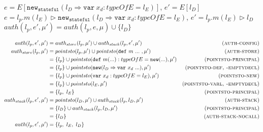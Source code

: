 \documentclass{llncs}
\newcommand{\keywadj}[1]{\mathtt{#1}}
\newcommand{\keyw}[1]{\keywadj{#1}~}
\begin{document}
\noindent$e = E[\keywadj{new}_{\keywadj{stateful}}(l_D \Rightarrow \keyw{var} x_d : typeOfE = l_E)]$, $e' = E[l_D]$\\

\noindent$e = l_p.m(l_E) \rhd \keywadj{new}_{\keywadj{stateful}}(l_D \Rightarrow \keyw{var} x_d : typeOfE = l_E)$, $e' = l_p.m(l_E) \rhd l_D$\\

\noindent$auth(l_p, e', \mu') = auth(l_p, e, \mu) \cup \{ l_D \}$

\begin{align*}
auth(l_p, e', \mu') &= auth_{store}(l_p, \mu') \cup auth_{stack}(l_p, e', \mu') & (\textsc{auth-config})\\
auth_{store}(l_p, \mu') &= pointsto(l_p, \mu') \cup pointsto(\keyw{def} m~...~, \mu') & (\textsc{auth-store})\\
 &= \{ l_p \} \cup pointsto(\keyw{def} m(...) : typeOfE = \keywadj{new}(...), \mu') & (\textsc{pointsto-principal})\\
 &= \{ l_p \} \cup pointsto(\keywadj{new}(l_D \Rightarrow \keyw{var} x_d~...), \mu') & (\textsc{pointsto-def, -emptydecl})\\
 &= \{ l_p \} \cup pointsto(\keyw{var} x_d : typeOfE = l_E), \mu') & (\textsc{pointsto-new})\\
 &= \{ l_p \} \cup pointsto(l_E, \mu') & (\textsc{pointsto-varl, -emptydecl})\\ 
 &= \{ l_p,~l_E \} & (\textsc{pointsto-principal})\\
auth_{stack}(l_p, e', \mu') &= pointsto(l_D, \mu') \cup auth_{stack}(l_p, l_D, \mu') & (\textsc{auth-stack})\\
 &= \{ l_D \} \cup auth_{stack}(l_p, l_D, \mu') & (\textsc{pointsto-principal})\\
 &= \{ l_D \} & (\textsc{auth-stack-nocall})\\
auth(l_p, e', \mu') &= \{ l_p,~l_E,~l_D \} &\\
\end{align*}
\end{document}
